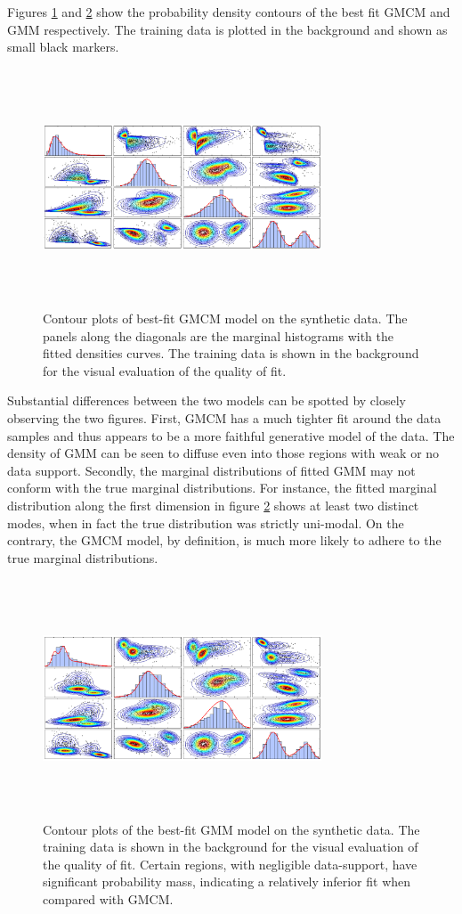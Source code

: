 \documentclass[]{article}
\begin{document}
Figures \ref{fig:gmcm_best_fit} and \ref{fig:gmm_best_fit} show the probability density contours of the best fit GMCM and GMM respectively. The training data is plotted in the background and shown as small black markers.  
\begin{figure}[H]
\includegraphics[width= 235pt,height=200pt]{gmcm_best_fit_synthetic_data_contours}
\caption{Contour plots of best-fit GMCM model on the synthetic data. The panels along the diagonals are the marginal histograms with the fitted densities curves. The training data is shown in the background for the visual evaluation of the quality of fit.}
\label{fig:gmcm_best_fit}
\end{figure}
Substantial differences between the two models can be spotted by closely observing the two figures. First, GMCM has a much tighter fit around the data samples and thus appears to be a more faithful generative model of the data. The density of GMM can be seen to diffuse even into those regions with weak or no data support. Secondly, the marginal distributions of fitted GMM may not conform with the true marginal distributions. For instance, the fitted marginal distribution along the first dimension in figure \ref{fig:gmm_best_fit} shows at least two distinct modes, when in fact the true distribution was strictly uni-modal. On the contrary, the GMCM model, by definition, is much more likely to adhere to the true marginal distributions.
\begin{figure}[h]
\includegraphics[width= 235pt,height=200pt]{gmm_best_fit_synthetic_data_contours}
\caption{Contour plots of the best-fit GMM model on the synthetic data. The training data is shown in the background for the visual evaluation of the quality of fit. Certain regions, with negligible data-support, have significant probability mass, indicating a relatively inferior fit when compared with GMCM.}
\label{fig:gmm_best_fit}
\end{figure}
\end{document}
